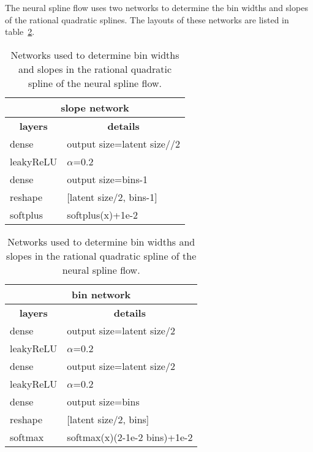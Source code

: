 \documentclass[10pt]{article} \usepackage[accepted]{tmlr}
\begin{document}
The neural spline flow uses two networks to determine the bin widths and slopes of the rational quadratic splines. The layouts of these networks are listed in table~\ref{tab:bin_archi}. 
\begin{table}[h]
\begin{tabular}{ll}
\multicolumn{2}{c}{\textbf{slope network}}                                        \\ \hline
\multicolumn{1}{c|}{\textbf{layers}} & \multicolumn{1}{c}{\textbf{details}}       \\ \hline
\multicolumn{1}{l|}{dense}           & output size=latent size//2               \\
\multicolumn{1}{l|}{leakyReLU}       & $\alpha$=0.2                                  \\
\multicolumn{1}{l|}{dense}           & output size=bins-1                      \\
\multicolumn{1}{l|}{reshape}         & {[}latent size/2, bins-1{]} \\
\multicolumn{1}{l|}{softplus}        & softplus(x)+1e-2  \\     

\end{tabular}
\hfill
\begin{tabular}{ll}
\multicolumn{2}{c}{\textbf{bin network}}                                       \\ \hline
\multicolumn{1}{c|}{\textbf{layers}} & \multicolumn{1}{c}{\textbf{details}}     \\ \hline
\multicolumn{1}{l|}{dense}          & output size=latent size/2             \\
\multicolumn{1}{l|}{leakyReLU}      & $\alpha$=0.2                                \\
\multicolumn{1}{l|}{dense}          & output size=latent size/2            \\
\multicolumn{1}{l|}{leakyReLU}      & $\alpha$=0.2                                \\
\multicolumn{1}{l|}{dense}          & output size=bins                       \\
\multicolumn{1}{l|}{reshape}        & {[}latent size/2, bins{]} \\
\multicolumn{1}{l|}{softmax}        & softmax(x)(2-1e-2 bins)+1e-2   
\end{tabular}
\caption{\label{tab:bin_archi} Networks used to determine bin widths and slopes in the rational quadratic spline of the neural spline flow.}
\end{table}
\end{document}
